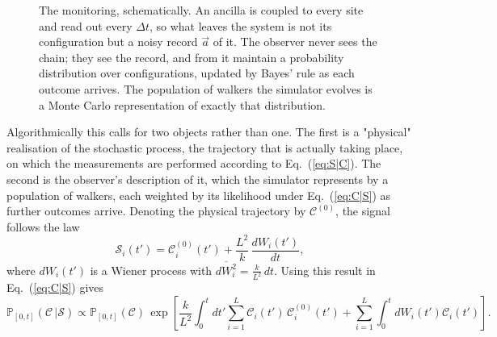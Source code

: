 \documentclass[11pt]{article}
\begin{document}
\begin{figure}[htbp]
\caption{The monitoring, schematically. An ancilla is coupled to every site and read out every $\Delta t$, so what leaves the system is not its configuration but a noisy record $\vec{a}$ of it. The observer never sees the chain; they see the record, and from it maintain a probability distribution over configurations, updated by Bayes' rule as each outcome arrives. The population of walkers the simulator evolves is a Monte Carlo representation of exactly that distribution.}
\label{fig:measurement}
\end{figure}

Algorithmically this calls for two objects rather than one. The first is a "physical" realisation of the stochastic process, the trajectory that is actually taking place, on which the measurements are performed according to Eq.~(\ref{eq:S|C}). The second is the observer's description of it, which the simulator represents by a population of walkers, each weighted by its likelihood under Eq.~(\ref{eq:C|S}) as further outcomes arrive. Denoting the physical trajectory by $\mathcal{C}^{(0)}$, the signal follows the law
\begin{equation}\label{eq:SWiener}
    \mathcal{S}_i(t') =\mathcal{C}^{(0)}_i(t') + \frac{L^2}{k}\,\frac{dW_i(t')}{dt},
\end{equation}
where $dW_i(t')$ is a Wiener process with $\overline{dW_i^2}=\frac{k}{L^2}\,dt$. Using this result in Eq.~(\ref{eq:C|S}) gives 
\begin{equation}\label{eq:C|C0W}
    \mathbb{P}_{\left[0,t\right]}\left(\mathcal{C}\,\left|\mathcal{S}\right.\right) \propto \mathbb{P}_{\left[0,t\right]}\left(\mathcal{C}\right)\,\exp\left[\frac{k}{L^2}\int_0^t dt' \sum_{i=1}^L \mathcal{C}_i(t')\, \mathcal{C}^{(0)}_i(t')+\sum_{i=1}^L\int_0^t dW_i(t') \mathcal{C}_i(t') \right] .
\end{equation}
\end{document}
